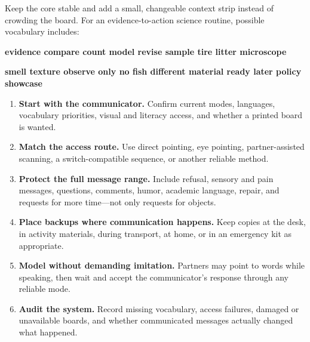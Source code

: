 \vspace{0.08in}

Keep the core stable and add a small, changeable context strip instead of crowding the board. For an evidence-to-action science routine, possible vocabulary includes:

\begin{center}
\colorbox{SoftGray}{\parbox{0.94\textwidth}{\centering\small
\textbf{evidence \quad compare \quad count \quad model \quad revise \quad sample \quad tire \quad litter \quad microscope}\par
\vspace{0.03in}
\textbf{smell \quad texture \quad observe only \quad no fish \quad different material \quad ready later \quad policy \quad showcase}
}}
\end{center}


\begin{enumerate}
  \item \textbf{Start with the communicator.} Confirm current modes, languages, vocabulary priorities, visual and literacy access, and whether a printed board is wanted.
  \item \textbf{Match the access route.} Use direct pointing, eye pointing, partner-assisted scanning, a switch-compatible sequence, or another reliable method.
  \item \textbf{Protect the full message range.} Include refusal, sensory and pain messages, questions, comments, humor, academic language, repair, and requests for more time---not only requests for objects.
  \item \textbf{Place backups where communication happens.} Keep copies at the desk, in activity materials, during transport, at home, or in an emergency kit as appropriate.
  \item \textbf{Model without demanding imitation.} Partners may point to words while speaking, then wait and accept the communicator's response through any reliable mode.
  \item \textbf{Audit the system.} Record missing vocabulary, access failures, damaged or unavailable boards, and whether communicated messages actually changed what happened.
\end{enumerate}

